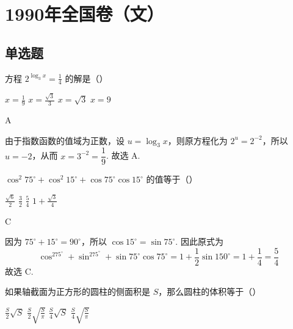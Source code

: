 \documentclass[UTF8,a4paper,oneside,11pt]{ctexbook}
\begin{document}
\mainmatter

\chapter{1990年全国卷（文）}
\section{单选题}

\begin{problem}
方程 \(2^{\log_3 x}=\frac{1}{4}\) 的解是（\quad）

\choices
    {\(x=\frac{1}{9}\)}
    {\(x=\frac{\sqrt{3}}{3}\)}
    {\(x=\sqrt{3}\)}
    {\(x=9\)}
\end{problem}

\begin{answer}A\end{answer}

\begin{solution}
由于指数函数的值域为正数，设 \(u=\log_3x\)，则原方程化为 \(2^u=2^{-2}\)，所以 \(u=-2\)，从而 \(x=3^{-2}=\dfrac{1}{9}\). 故选 A.
\end{solution}


\begin{problem}
\(\cos^2 75^\circ+\cos^2 15^\circ+\cos 75^\circ \cos 15^\circ\) 的值等于（\quad）

\choices
    {\(\frac{\sqrt{6}}{2}\)}
    {\(\frac{3}{2}\)}
    {\(\frac{5}{4}\)}
    {\(1+\frac{\sqrt{3}}{4}\)}
\end{problem}

\begin{answer}C\end{answer}

\begin{solution}
因为 \(75^\circ+15^\circ=90^\circ\)，所以 \(\cos15^\circ=\sin75^\circ\). 因此原式为
\[
\cos^275^\circ+\sin^275^\circ+\sin75^\circ\cos75^\circ=1+\frac{1}{2}\sin150^\circ=1+\frac14=\frac54
\]
故选 C.
\end{solution}


\begin{problem}
如果轴截面为正方形的圆柱的侧面积是 \(S\)，那么圆柱的体积等于（\quad）

\choices
    {\(\frac{S}{2}\sqrt{S}\)}
    {\(\frac{S}{2}\sqrt{\frac{S}{\pi}}\)}
    {\(\frac{S}{4}\sqrt{S}\)}
    {\(\frac{S}{4}\sqrt{\frac{S}{\pi}}\)}
\end{problem}
\end{document}
